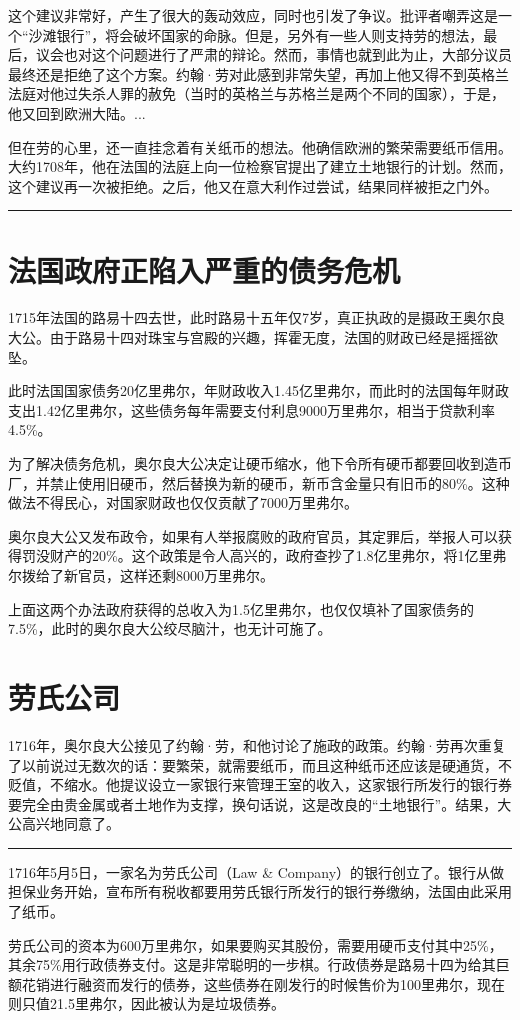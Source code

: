 \documentclass[12pt,oneside]{book}
\newcommand\hr{\par\noindent\hrule}
\begin{document}
这个建议非常好，产生了很大的轰动效应，同时也引发了争议。批评者嘲弄这是一个“沙滩银行”，将会破坏国家的命脉。但是，另外有一些人则支持劳的想法，最后，议会也对这个问题进行了严肃的辩论。然而，事情也就到此为止，大部分议员最终还是拒绝了这个方案。约翰·劳对此感到非常失望，再加上他又得不到英格兰法庭对他过失杀人罪的赦免（当时的英格兰与苏格兰是两个不同的国家），于是，他又回到欧洲大陆。...

但在劳的心里，还一直挂念着有关纸币的想法。他确信欧洲的繁荣需要纸币信用。大约1708年，他在法国的法庭上向一位检察官提出了建立土地银行的计划。然而，这个建议再一次被拒绝。之后，他又在意大利作过尝试，结果同样被拒之门外。
\hr 

\section{法国政府正陷入严重的债务危机}
1715年法国的路易十四去世，此时路易十五年仅7岁，真正执政的是摄政王奥尔良大公。由于路易十四对珠宝与宫殿的兴趣，挥霍无度，法国的财政已经是摇摇欲坠。

此时法国国家债务20亿里弗尔，年财政收入1.45亿里弗尔，而此时的法国每年财政支出1.42亿里弗尔，这些债务每年需要支付利息9000万里弗尔，相当于贷款利率4.5\%。

为了解决债务危机，奥尔良大公决定让硬币缩水，他下令所有硬币都要回收到造币厂，并禁止使用旧硬币，然后替换为新的硬币，新币含金量只有旧币的80\%。这种做法不得民心，对国家财政也仅仅贡献了7000万里弗尔。

奥尔良大公又发布政令，如果有人举报腐败的政府官员，其定罪后，举报人可以获得罚没财产的20\%。这个政策是令人高兴的，政府查抄了1.8亿里弗尔，将1亿里弗尔拨给了新官员，这样还剩8000万里弗尔。

上面这两个办法政府获得的总收入为1.5亿里弗尔，也仅仅填补了国家债务的7.5\%，此时的奥尔良大公绞尽脑汁，也无计可施了。

\section{劳氏公司}
1716年，奥尔良大公接见了约翰·劳，和他讨论了施政的政策。约翰·劳再次重复了以前说过无数次的话：要繁荣，就需要纸币，而且这种纸币还应该是硬通货，不贬值，不缩水。他提议设立一家银行来管理王室的收入，这家银行所发行的银行券要完全由贵金属或者土地作为支撑，换句话说，这是改良的“土地银行”。结果，大公高兴地同意了。

\hr 
1716年5月5日，一家名为劳氏公司（Law \& Company）的银行创立了。银行从做担保业务开始，宣布所有税收都要用劳氏银行所发行的银行券缴纳，法国由此采用了纸币。

劳氏公司的资本为600万里弗尔，如果要购买其股份，需要用硬币支付其中25\%，其余75\%用行政债券支付。这是非常聪明的一步棋。行政债券是路易十四为给其巨额花销进行融资而发行的债券，这些债券在刚发行的时候售价为100里弗尔，现在则只值21.5里弗尔，因此被认为是垃圾债券。
\end{document}

